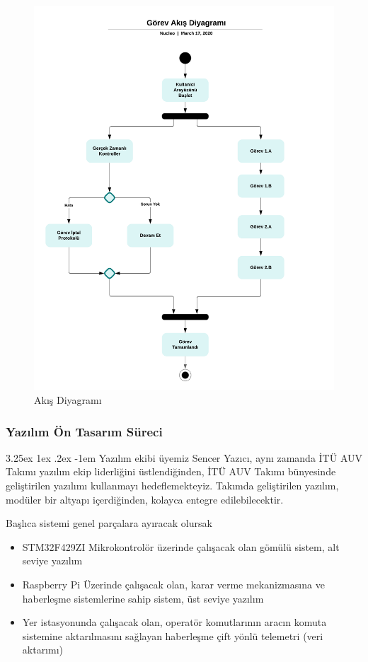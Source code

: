 \documentclass[12pt]{article}
\makeatletter
\renewcommand\paragraph{\@startsection{paragraph}{5}{\z@}%
  {3.25ex \@plus1ex \@minus.2ex}%
  {-1em}%
  {\normalfont\normalsize\bfseries}}
\makeatother
\begin{document}
\begin{figure}[hbt!]
\centering
\includegraphics[width=1\textwidth]{akis-diyagrami.png}
\caption{Akış Diyagramı}
\label{fig:flow-chart}
\end{figure}


\subsubsection{Yazılım Ön Tasarım Süreci}


\paragraph{} Yazılım ekibi üyemiz Sencer Yazıcı, aynı zamanda İTÜ AUV Takımı yazılım ekip liderliğini üstlendiğinden, İTÜ AUV Takımı bünyesinde geliştirilen yazılımı kullanmayı hedeflemekteyiz. Takımda geliştirilen yazılım, modüler bir altyapı içerdiğinden, kolayca entegre edilebilecektir.

Başlıca sistemi genel parçalara ayıracak olursak
\begin{itemize}
    \item STM32F429ZI Mikrokontrolör üzerinde çalışacak olan gömülü sistem, alt seviye yazılım
    \item Raspberry Pi Üzerinde çalışacak olan, karar verme mekanizmasına ve haberleşme sistemlerine sahip sistem, üst seviye yazılım
    \item Yer istasyonunda çalışacak olan, operatör komutlarının aracın komuta sistemine aktarılmasını sağlayan haberleşme çift yönlü telemetri (veri aktarımı)
\end{itemize}
\end{document}
